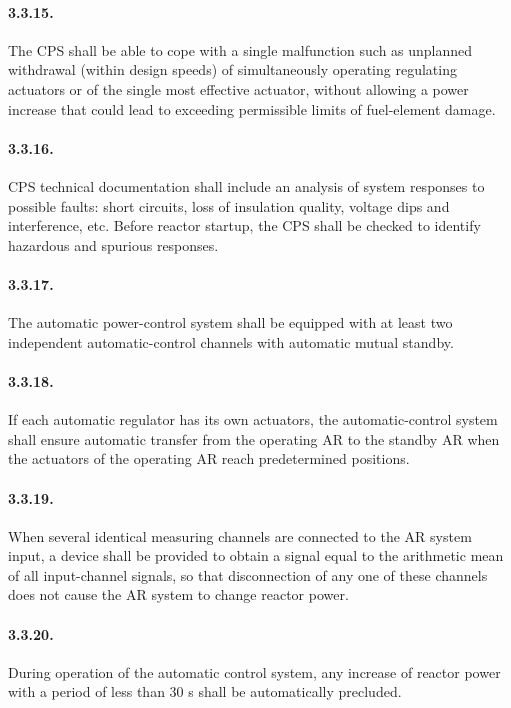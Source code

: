 \documentclass[openright]{bookest}
\begin{document}
\paragraph{3.3.15.} The CPS shall be able to cope with a single malfunction such as unplanned withdrawal (within design speeds) of simultaneously operating regulating actuators or of the single most effective actuator, without allowing a power increase that could lead to exceeding permissible limits of fuel-element damage.

\paragraph{3.3.16.} CPS technical documentation shall include an analysis of system responses to possible faults: short circuits, loss of insulation quality, voltage dips and interference, etc. Before reactor startup, the CPS shall be checked to identify hazardous and spurious responses.

\paragraph{3.3.17.} The automatic power-control system shall be equipped with at least two independent automatic-control channels with automatic mutual standby.

\paragraph{3.3.18.} If each automatic regulator has its own actuators, the automatic-control system shall ensure automatic transfer from the operating AR to the standby AR when the actuators of the operating AR reach predetermined positions.

\paragraph{3.3.19.} When several identical measuring channels are connected to the AR system input, a device shall be provided to obtain a signal equal to the arithmetic mean of all input-channel signals, so that disconnection of any one of these channels does not cause the AR system to change reactor power.

\paragraph{3.3.20.} During operation of the automatic control system, any increase of reactor power with a period of less than 30 s shall be automatically precluded.
\end{document}
